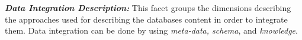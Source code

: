 
\textbf{\textit{Data Integration Description:}}
 This facet groups the dimensions describing the approaches used for describing the databases content in order to  integrate them. Data integration can be done by using {\em meta-data, schema}, and {\em knowledge}.


